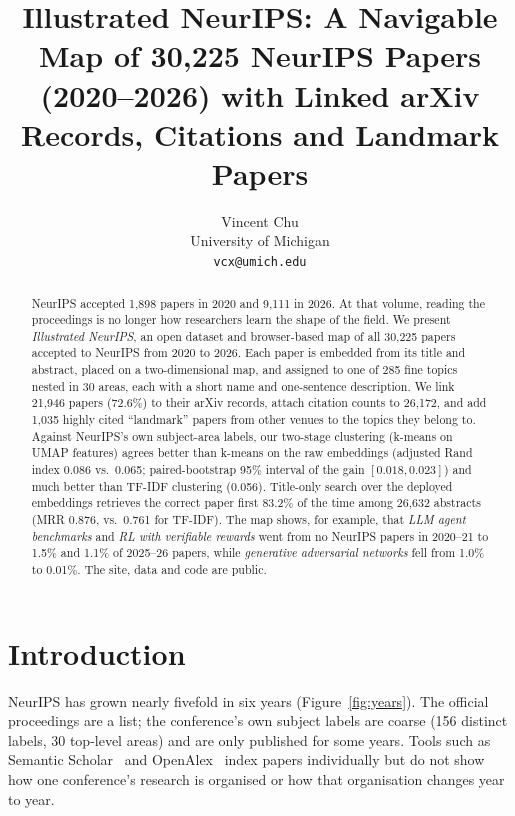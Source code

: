 \documentclass{article}
\title{Illustrated NeurIPS: A Navigable Map of 30{,}225 NeurIPS Papers (2020--2026) with Linked arXiv Records, Citations and Landmark Papers}
\author{%
  Vincent Chu\\
  University of Michigan\\
  \texttt{vcx@umich.edu}
}
\begin{document}
\maketitle

\begin{abstract}
NeurIPS accepted 1{,}898 papers in 2020 and 9{,}111 in 2026. At that volume, reading the proceedings is no longer how researchers learn the shape of the field. We present \emph{Illustrated NeurIPS}, an open dataset and browser-based map of all 30{,}225 papers accepted to NeurIPS from 2020 to 2026. Each paper is embedded from its title and abstract, placed on a two-dimensional map, and assigned to one of 285 fine topics nested in 30 areas, each with a short name and one-sentence description. We link 21{,}946 papers (72.6\%) to their arXiv records, attach citation counts to 26{,}172, and add 1{,}035 highly cited ``landmark'' papers from other venues to the topics they belong to. Against NeurIPS's own subject-area labels, our two-stage clustering (k-means on UMAP features) agrees better than k-means on the raw embeddings (adjusted Rand index 0.086 vs.\ 0.065; paired-bootstrap 95\% interval of the gain $[0.018, 0.023]$) and much better than TF-IDF clustering (0.056). Title-only search over the deployed embeddings retrieves the correct paper first 83.2\% of the time among 26{,}632 abstracts (MRR 0.876, vs.\ 0.761 for TF-IDF). The map shows, for example, that \emph{LLM agent benchmarks} and \emph{RL with verifiable rewards} went from no NeurIPS papers in 2020--21 to 1.5\% and 1.1\% of 2025--26 papers, while \emph{generative adversarial networks} fell from 1.0\% to 0.01\%. The site, data and code are public.
\end{abstract}



\section{Introduction}
NeurIPS has grown nearly fivefold in six years (Figure~\ref{fig:years}). The official proceedings are a list; the conference's own subject labels are coarse (156 distinct labels, 30 top-level areas) and are only published for some years. Tools such as Semantic Scholar~\cite{kinney2023s2} and OpenAlex~\cite{priem2022openalex} index papers individually but do not show how one conference's research is organised or how that organisation changes year to year.
\end{document}
